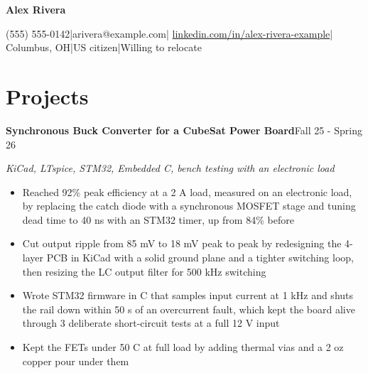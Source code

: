 \documentclass[letterpaper,11pt]{article}
\newlength{\itemgap}           %
\newcommand{\entry}[2]{\textbf{#1}\hfill #2\par}
\newcommand{\skillsused}[1]{\textit{#1}\par}
\newcommand{\sep}{\hspace{0.35em}|\hspace{0.35em}}
\begin{document}
{\LARGE\bfseries Alex Rivera}\par
\vspace{2pt}
{\fontsize{9.5}{11.5}\selectfont (555) 555-0142\sep arivera@example.com\sep
\href{https://linkedin.com/in/alex-rivera-example}{linkedin.com/in/alex-rivera-example}\sep
Columbus, OH\sep US citizen\sep Willing to relocate\par}


\section{Projects}

\entry{Synchronous Buck Converter for a CubeSat Power Board}{Fall 25 - Spring 26}
\skillsused{KiCad, LTspice, STM32, Embedded C, bench testing with an electronic load}
\begin{itemize}
  \item Reached 92\% peak efficiency at a 2 A load, measured on an electronic load, by replacing the catch diode with a synchronous MOSFET stage and tuning dead time to 40 ns with an STM32 timer, up from 84\% before
  \item Cut output ripple from 85 mV to 18 mV peak to peak by redesigning the 4-layer PCB in KiCad with a solid ground plane and a tighter switching loop, then resizing the LC output filter for 500 kHz switching
  \item Wrote STM32 firmware in C that samples input current at 1 kHz and shuts the rail down within 50 \textmu s of an overcurrent fault, which kept the board alive through 3 deliberate short-circuit tests at a full 12 V input
  \item Kept the FETs under 50 \textdegree{}C at full load by adding thermal vias and a 2 oz copper pour under them
\end{itemize}
\vspace{\itemgap}
\end{document}
